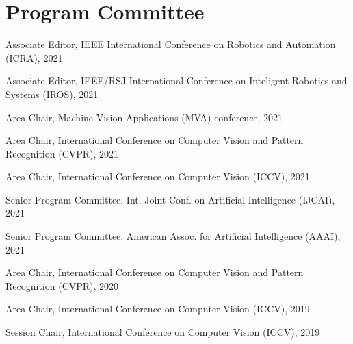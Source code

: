 \documentclass[letterpaper,11pt]{article}
\newcommand{\resumeItem}[1]{
  \small{
  \item{#1 \vspace{-2pt}}
  }
}
\newcommand{\resumeItemListStart}{\begin{itemize}}
\newcommand{\resumeItemListEnd}{\end{itemize}\vspace{-5pt}}
\begin{document}
\section{Program Committee}
\resumeItemListStart
    \resumeItem{Associate Editor, IEEE International Conference on Robotics and Automation (ICRA),  2021}
    \resumeItem{Associate Editor, IEEE/RSJ International Conference on Inteligent Robotics and Systems (IROS),  2021}
    \resumeItem{Area Chair, Machine Vision Applications (MVA) conference,  2021}
    \resumeItem{Area Chair, International Conference on Computer Vision and Pattern Recognition (CVPR),  2021}
    \resumeItem{Area Chair, International Conference on Computer Vision (ICCV),  2021}
    \resumeItem{Senior Program Committee, Int. Joint Conf. on Artificial Intelligence (IJCAI),  2021}
    \resumeItem{Senior Program Committee, American Assoc. for Artificial Intelligence (AAAI),  2021}
    \resumeItem{Area Chair, International Conference on Computer Vision and Pattern Recognition (CVPR),  2020}
    \resumeItem{Area Chair, International Conference on Computer Vision (ICCV),  2019}
    \resumeItem{Session Chair, International Conference on Computer Vision (ICCV),  2019}
\resumeItemListEnd
\end{document}

